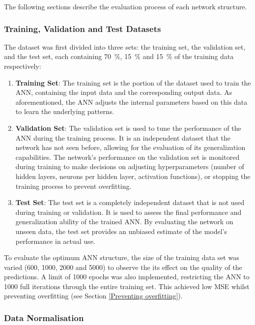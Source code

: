 The following sections describe the evaluation process of each network structure.

\subsubsection{Training, Validation and Test Datasets}

The dataset was first divided into three sets: the training set, the validation set, and the test set, each containing 70~$\%$, 15~$\%$ and 15~$\%$ of the training data respectively:

\begin{enumerate}
	\item \textbf{Training Set}: The training set is the portion of the dataset used to train the ANN, containing the input data and the corresponding output data. As aforementioned, the ANN adjusts the internal parameters based on this data to learn the underlying patterns.
	\item \textbf{Validation Set}: The validation set is used to tune the performance of the ANN during the training process. It is an independent dataset that the network has not seen before, allowing for the evaluation of its generalization capabilities. The network's performance on the validation set is monitored during training to make decisions on adjusting hyperparameters (number of hidden layers, neurons per hidden layer, activation functions), or stopping the training process to prevent overfitting.
	\item \textbf{Test Set}: The test set is a completely independent dataset that is not used during training or validation. It is used to assess the final performance and generalization ability of the trained ANN. By evaluating the network on unseen data, the test set provides an unbiased estimate of the model's performance in actual use.
\end{enumerate}

To evaluate the optimum ANN structure, the size of the training data set was varied (600, 1000, 2000 and 5000) to observe the its effect on the quality of the predictions. A limit of 1000 epochs was also implemented, restricting the ANN to 1000 full iterations through the entire training set. This achieved low MSE whilst preventing overfitting (see Section \ref{Preventing overfitting}).

\subsubsection{Data Normalisation}


